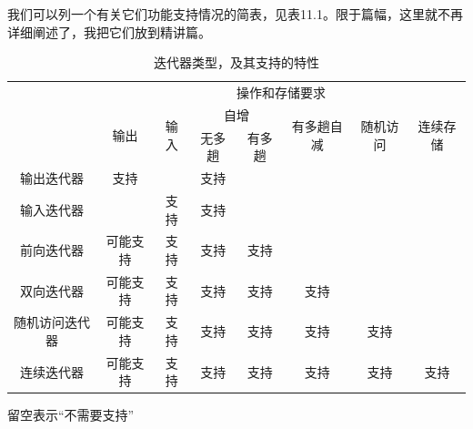 我们可以列一个有关它们功能支持情况的简表，见表11.1。限于篇幅，这里就不再详细阐述了，我把它们放到精讲篇。
\begin{table}[htbp]
\centering
\begin{tabular}{cccccccc}
\hline\rule{0pt}{2.4ex}
\multirow{3}{*}{迭代器类型} & \multicolumn{7}{c}{操作和存储要求}\\
\cline{2-8}\rule{0pt}{2.4ex}
& \multirow{2}{*}{输出} & \multirow{2}{*}{输入} & \multicolumn{2}{c}{自增} & \multirow{2}{*}{有多趟自减} & \multirow{2}{*}{随机访问} & \multirow{2}{*}{连续存储}\\
\cline{4-5}\rule{0pt}{2.4ex}
& & & 无多趟 & 有多趟 & & &\\
\hline\hline\rule{0pt}{2.4ex}
输出迭代器 & 支持 & & 支持\\
\hline\rule{0pt}{2.4ex}
输入迭代器 & & 支持 & 支持\\
\hline\rule{0pt}{2.4ex}
前向迭代器 & 可能支持 & 支持 & 支持 & 支持\\
\hline\rule{0pt}{2.4ex}
双向迭代器 & 可能支持 & 支持 & 支持 & 支持 & 支持\\
\hline\rule{0pt}{2.4ex}
随机访问迭代器 & 可能支持 & 支持 & 支持 & 支持 & 支持 & 支持\\
\hline\rule{0pt}{2.4ex}
连续迭代器 & 可能支持 & 支持 & 支持 & 支持 & 支持 & 支持 & 支持\\
\hline
\end{tabular}
\caption{迭代器类型，及其支持的特性}
\footnotesize{留空表示``不需要支持''}
\end{table}\par
